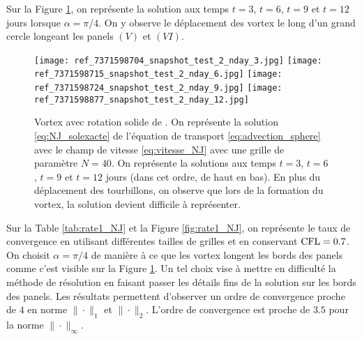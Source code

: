 Sur la Figure \ref{fig:NJ_difftps}, on représente la solution aux temps $t=3$, $t=6$, $t=9$ et $t=12$ jours lorsque $\alpha = \pi/4$. On y observe le déplacement des vortex le long d'un grand cercle longeant les panels $(V)$ et $(VI)$.

\begin{figure}[htbp]
\begin{center}
\texttt{[image: ref\_7371598704\_snapshot\_test\_2\_nday\_3.jpg]}
\texttt{[image: ref\_7371598715\_snapshot\_test\_2\_nday\_6.jpg]}
\texttt{[image: ref\_7371598724\_snapshot\_test\_2\_nday\_9.jpg]}
\texttt{[image: ref\_7371598877\_snapshot\_test\_2\_nday\_12.jpg]}
\end{center}
\caption{Vortex avec rotation solide de \cite{Nair2008}. On représente la solution \eqref{eq:NJ_solexacte} de l'équation de transport \eqref{eq:advection_sphere} avec le champ de vitesse \eqref{eq:vitesse_NJ} avec une grille de paramètre $N=40$. On représente la solutions aux temps $t=3$, $t=6$, $t=9$ et $t=12$ jours (dans cet ordre, de haut en bas). En plus du déplacement des tourbillons, on observe que lors de la formation du vortex, la solution devient difficile à représenter.}
\label{fig:NJ_difftps} 
\end{figure}

Sur la Table \ref{tab:rate1_NJ} et la Figure \ref{fig:rate1_NJ}, on représente le taux de convergence en utilisant différentes tailles de grilles et en conservant $\text{CFL} = 0.7$. On choisit $\alpha = \pi/4$ de manière à ce que les vortex longent les bords des panels comme c'est visible sur la Figure \ref{fig:NJ_difftps}. Un tel choix vise à mettre en difficulté la méthode de résolution en faisant passer les détails fins de la solution sur les bords des panels. Les résultats permettent d'observer un ordre de convergence proche de $4$ en norme $\| \cdot \|_1$ et $\| \cdot \|_2$. L'ordre de convergence est proche de $3.5$ pour la norme $\| \cdot \|_{\infty}$. 

